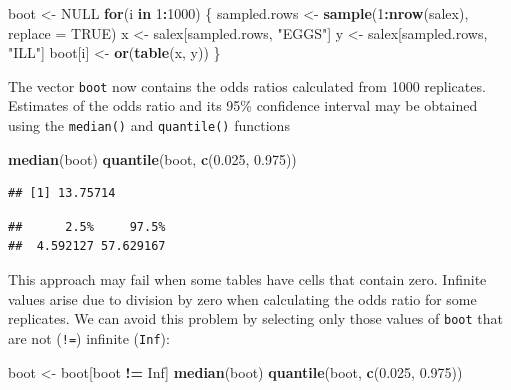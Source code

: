 \documentclass[12pt,a4paper]{book}
\newenvironment{Shaded}{\begin{snugshade}}{\end{snugshade}}
\newcommand{\KeywordTok}[1]{\textcolor[rgb]{0.13,0.29,0.53}{\textbf{#1}}}
\newcommand{\DataTypeTok}[1]{\textcolor[rgb]{0.13,0.29,0.53}{#1}}
\newcommand{\DecValTok}[1]{\textcolor[rgb]{0.00,0.00,0.81}{#1}}
\newcommand{\FloatTok}[1]{\textcolor[rgb]{0.00,0.00,0.81}{#1}}
\newcommand{\StringTok}[1]{\textcolor[rgb]{0.31,0.60,0.02}{#1}}
\newcommand{\OtherTok}[1]{\textcolor[rgb]{0.56,0.35,0.01}{#1}}
\newcommand{\ControlFlowTok}[1]{\textcolor[rgb]{0.13,0.29,0.53}{\textbf{#1}}}
\newcommand{\OperatorTok}[1]{\textcolor[rgb]{0.81,0.36,0.00}{\textbf{#1}}}
\newcommand{\NormalTok}[1]{#1}
\theoremstyle{definition}
\theoremstyle{definition}
\theoremstyle{definition}
\theoremstyle{remark}
\begin{document}
\begin{Shaded}
\begin{Highlighting}[]
\NormalTok{boot <-}\StringTok{ }\OtherTok{NULL}
\ControlFlowTok{for}\NormalTok{(i }\ControlFlowTok{in} \DecValTok{1}\OperatorTok{:}\DecValTok{1000}\NormalTok{) \{}
\NormalTok{  sampled.rows <-}\StringTok{ }\KeywordTok{sample}\NormalTok{(}\DecValTok{1}\OperatorTok{:}\KeywordTok{nrow}\NormalTok{(salex), }\DataTypeTok{replace =} \OtherTok{TRUE}\NormalTok{)}
\NormalTok{  x <-}\StringTok{ }\NormalTok{salex[sampled.rows, }\StringTok{"EGGS"}\NormalTok{]}
\NormalTok{  y <-}\StringTok{ }\NormalTok{salex[sampled.rows, }\StringTok{"ILL"}\NormalTok{]}
\NormalTok{  boot[i] <-}\StringTok{ }\KeywordTok{or}\NormalTok{(}\KeywordTok{table}\NormalTok{(x, y))}
\NormalTok{\}}
\end{Highlighting}
\end{Shaded}

The vector \texttt{boot} now contains the odds ratios calculated from
1000 replicates. Estimates of the odds ratio and its 95\% confidence
interval may be obtained using the \texttt{median()} and
\texttt{quantile()} functions

\begin{Shaded}
\begin{Highlighting}[]
\KeywordTok{median}\NormalTok{(boot)}
\KeywordTok{quantile}\NormalTok{(boot, }\KeywordTok{c}\NormalTok{(}\FloatTok{0.025}\NormalTok{, }\FloatTok{0.975}\NormalTok{))}
\end{Highlighting}
\end{Shaded}

\begin{verbatim}
## [1] 13.75714
\end{verbatim}

\begin{verbatim}
##      2.5%     97.5% 
##  4.592127 57.629167
\end{verbatim}

This approach may fail when some tables have cells that contain zero.
Infinite values arise due to division by zero when calculating the odds
ratio for some replicates. We can avoid this problem by selecting only
those values of \texttt{boot} that are not (\texttt{!=}) infinite
(\texttt{Inf}):

\begin{Shaded}
\begin{Highlighting}[]
\NormalTok{boot <-}\StringTok{ }\NormalTok{boot[boot }\OperatorTok{!=}\StringTok{ }\OtherTok{Inf}\NormalTok{]}
\KeywordTok{median}\NormalTok{(boot)}
\KeywordTok{quantile}\NormalTok{(boot, }\KeywordTok{c}\NormalTok{(}\FloatTok{0.025}\NormalTok{, }\FloatTok{0.975}\NormalTok{))}
\end{Highlighting}
\end{Shaded}
\end{document}
